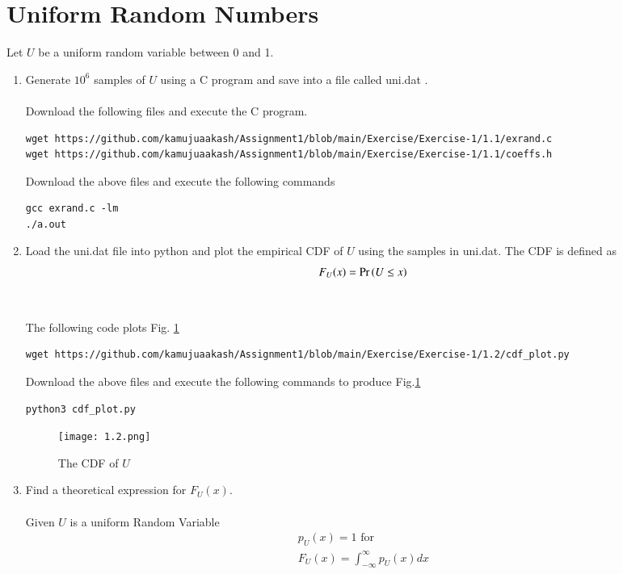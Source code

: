 \documentclass[journal,12pt,twocolumn]{IEEEtran}
\renewcommand\thesection{\arabic{section}}
\begin{document}
\section{Uniform Random Numbers}
Let $U$ be a uniform random variable between 0 and 1.
\begin{enumerate}[label=\thesection.\arabic*
,ref=\thesection.\theenumi]
\item Generate $10^6$ samples of $U$ using a C program and save into a file called uni.dat .
\\
\solution \\Download the following files and execute the  C program.
\begin{lstlisting}
wget https://github.com/kamujuaakash/Assignment1/blob/main/Exercise/Exercise-1/1.1/exrand.c
wget https://github.com/kamujuaakash/Assignment1/blob/main/Exercise/Exercise-1/1.1/coeffs.h
\end{lstlisting}
Download the above files and execute the following commands
\begin{lstlisting}
gcc exrand.c -lm
./a.out
\end{lstlisting}
\item
Load the uni.dat file into python and plot the empirical CDF of $U$ using the samples in uni.dat. The CDF is defined as
\begin{align}
F_{U}(x) = \Pr\left(U \le x\right)
\end{align}
\\
\solution  \\The following code plots Fig. \ref{fig:1.2}
\begin{lstlisting}
wget https://github.com/kamujuaakash/Assignment1/blob/main/Exercise/Exercise-1/1.2/cdf_plot.py
\end{lstlisting}
Download the above files and execute the following commands to produce Fig.\ref{fig:1.2}
\begin{lstlisting}
python3 cdf_plot.py
\end{lstlisting}
\begin{figure}[!h]
\centering
\texttt{[image: 1.2.png]}
\caption{The CDF of $U$}
\label{fig:1.2}
\end{figure}
%
\item
Find a  theoretical expression for $F_{U}(x)$.\\
\solution\\ Given $U$ is a uniform Random Variable
\begin{align*}
p_{U}(x)=1 \text{ for } \\
F_U(x)=\int_{-\infty}^{\infty}p_{U}(x)dx\\

\end{align*}
\end{enumerate}
\end{document}
